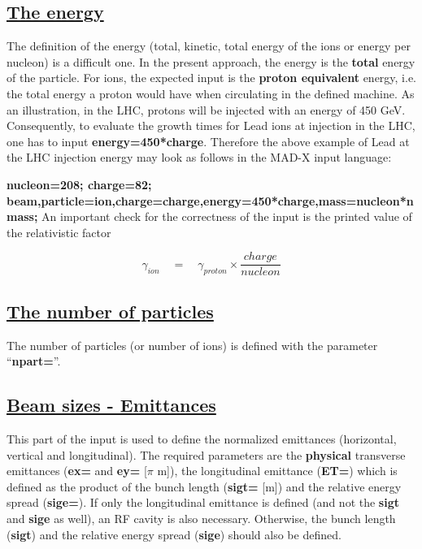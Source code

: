 {{\subsection{\href{SECTION00012000000000000000}{ The energy}}{  The definition of the energy (total, kinetic, total energy of the ions or energy per nucleon) is a difficult one. In the present approach, the energy is the \textbf{total} energy of the particle. For ions, the expected input is the \textbf{proton equivalent} energy, i.e. the total energy a proton would have when circulating in the defined machine. As an illustration, in the LHC, protons will be injected with an energy of 450 GeV. Consequently, to evaluate the growth times for Lead ions at injection in the LHC, one has to input \textbf{energy=450*charge}. Therefore the above example of Lead at the LHC injection energy may look as follows in the MAD-X input language: }

{ \textbf{ nucleon=208; charge=82; beam,particle=ion,charge=charge,energy=450*charge,mass=nucleon*nmass;}}  An important check for the correctness of the input is the printed value of the relativistic factor 


%  


\[
\gamma_{ion} \quad = \quad \gamma_{proton} \times \frac{charge}{nucleon}
\]


\subsection{\href{SECTION00013000000000000000}{ The number of particles}}{  The number of particles (or number of ions) is defined with the parameter ``\textbf{npart=}''. }



\subsection{\href{SECTION00014000000000000000}{ Beam sizes - Emittances}}{  This part of the input is used to define the normalized emittances (horizontal, vertical and longitudinal). The required parameters are the \textbf{physical} transverse emittances (\textbf{ex=} and \textbf{ey=} [$\pi$ m]), the longitudinal emittance (\textbf{ET=}) which is defined    as the product of the bunch length (\textbf{sigt=} [m]) and the relative energy spread (\textbf{sige=}). If only  the longitudinal emittance is defined (and not the \textbf{sigt} and \textbf{sige} as well), an RF cavity is also necessary. Otherwise, the bunch length (\textbf{sigt}) and the relative energy spread (\textbf{sige}) should also be defined.  }



}}
